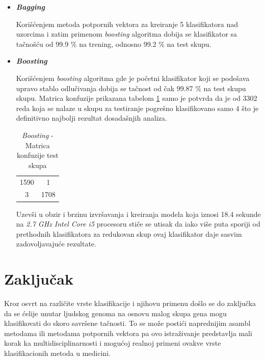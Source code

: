 \documentclass[a4paper]{article}
\begin{document}
\begin{itemize}
\item \textbf{\textit{Bagging}}

Korišćenjem metoda potpornih vektora za kreiranje 5 klasifikatora nad uzorcima i zatim primenom \textit{boosting} algoritma dobija se klasifikator sa tačnošću od 99.9 \% na trening, odnosno 99.2  \% na test skupu.

\item \textbf{\textit{Boosting}}

Korišćenjem \textit{boosting} algoritma gde je početni klasifikator koji se podešava upravo stablo odlučivanja dobija se tačnost od čak 99.87 \% na test skupu skupu. Matrica konfuzije prikazana tabelom \ref{table:asamblKonf}
samo je potvrda da je od 3302 reda koja se nalaze u skupu za testiranje pogrešno klasifikovano samo 4 što je definitivno najbolji rezultat dosadašnjih analiza. 



\begin{table}[h!]
\centering
\begin{tabular}{|c c|}
  \hline
  1590 & 1 \\
  3 & 1708  \\
 \hline
\end{tabular}
\caption{\textit{Boosting} - Matrica konfuzije test skupa}
\label{table:asamblKonf}
\end{table}

Uzevši u obzir i brzinu izvršavanja i kreiranja modela koja iznosi 18.4 sekunde na \textit{2.7 GHz Intel Core i5} procesoru stiče se utisak da iako više puta sporiji od prethodnih klasifikatora za redukovan skup ovaj klasifikator daje sasvim zadovoljavajuće rezultate.


\end{itemize}

\section{Zaključak}
\label{sec:zakljucak}

Kroz osvrt na različite vrste klasifikacije i njihovu primenu došlo se do zaključka da se ćelije unutar ljudskog genoma na osnovu malog skupa gena mogu klasifikovati do skoro savršene tačnosti. To se može postići naprednijim asambl metodama ili metodama potpornih vektora pa ovo istraživanje predstavlja mali korak ka multidisciplinarnosti i mogućoj realnoj primeni ovakve vrste klasifikacionih metoda u medicini.
\end{document}
